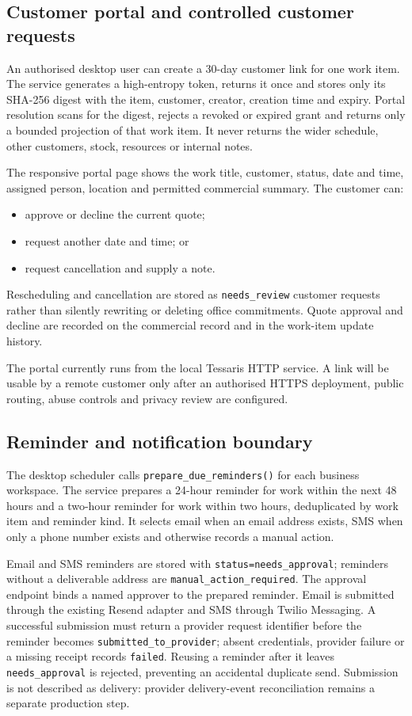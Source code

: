 \subsection{Customer portal and controlled customer requests}

An authorised desktop user can create a 30-day customer link for one work item.
The service generates a high-entropy token, returns it once and stores only its
SHA-256 digest with the item, customer, creator, creation time and expiry.  Portal
resolution scans for the digest, rejects a revoked or expired grant and returns
only a bounded projection of that work item.  It never returns the wider
schedule, other customers, stock, resources or internal notes.

The responsive portal page shows the work title, customer, status, date and time,
assigned person, location and permitted commercial summary.  The customer can:
\begin{itemize}[leftmargin=*]
  \item approve or decline the current quote;
  \item request another date and time; or
  \item request cancellation and supply a note.
\end{itemize}
Rescheduling and cancellation are stored as
\texttt{needs\_review} customer requests rather than silently rewriting or
deleting office commitments.  Quote approval and decline are recorded on the
commercial record and in the work-item update history.

The portal currently runs from the local Tessaris HTTP service.  A link will be
usable by a remote customer only after an authorised HTTPS deployment, public
routing, abuse controls and privacy review are configured.

\subsection{Reminder and notification boundary}

The desktop scheduler calls \texttt{prepare\_due\_reminders()} for each business
workspace.  The service prepares a 24-hour reminder for work within the next 48
hours and a two-hour reminder for work within two hours, deduplicated by work
item and reminder kind.  It selects email when an email address exists, SMS when
only a phone number exists and otherwise records a manual action.

Email and SMS reminders are stored with
\texttt{status=needs\_approval}; reminders without a deliverable address are
\texttt{manual\_action\_required}.  The approval endpoint
 binds a named approver
to the prepared reminder.  Email is submitted through the existing Resend
adapter and SMS through Twilio Messaging.  A successful submission must return
a provider request identifier before the reminder becomes
\texttt{submitted\_to\_provider}; absent credentials, provider failure or a
missing receipt records \texttt{failed}.  Reusing a reminder after it leaves
\texttt{needs\_approval} is rejected, preventing an accidental duplicate send.
Submission is not described as delivery: provider delivery-event reconciliation
remains a separate production step.

